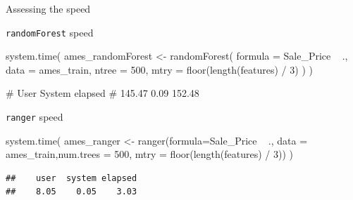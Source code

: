 \documentclass[
  10pt,
  ignorenonframetext,
]{beamer}
\newenvironment{Shaded}{}{}
\newcommand{\CommentTok}[1]{\textcolor[rgb]{0.00,0.50,0.00}{#1}}
\newcommand{\DataTypeTok}[1]{#1}
\newcommand{\DecValTok}[1]{#1}
\newcommand{\KeywordTok}[1]{\textcolor[rgb]{0.00,0.00,1.00}{#1}}
\newcommand{\NormalTok}[1]{#1}
\newcommand{\OperatorTok}[1]{#1}
\newcommand{\StringTok}[1]{\textcolor[rgb]{0.00,0.50,0.50}{#1}}
\begin{document}
\begin{frame}[fragile]{Assessing the speed}
\protect\hypertarget{assessing-the-speed}{}

\begin{block}{\texttt{randomForest} speed}

\begin{Shaded}
\begin{Highlighting}[]
\KeywordTok{system.time}\NormalTok{(}
\NormalTok{  ames_randomForest <-}\StringTok{ }\KeywordTok{randomForest}\NormalTok{(}
    \DataTypeTok{formula =}\NormalTok{ Sale_Price }\OperatorTok{~}\StringTok{ }\NormalTok{., }
    \DataTypeTok{data    =}\NormalTok{ ames_train, }
    \DataTypeTok{ntree   =} \DecValTok{500}\NormalTok{,}
    \DataTypeTok{mtry    =} \KeywordTok{floor}\NormalTok{(}\KeywordTok{length}\NormalTok{(features) }\OperatorTok{/}\StringTok{ }\DecValTok{3}\NormalTok{)}
\NormalTok{  )}
\NormalTok{)}
\end{Highlighting}
\end{Shaded}

\begin{Shaded}
\begin{Highlighting}[]
\CommentTok{#       User      System    elapsed }
\CommentTok{#     145.47        0.09      152.48 }
\end{Highlighting}
\end{Shaded}

\end{block}

\end{frame}

\begin{frame}[fragile]{\texttt{ranger} speed}
\protect\hypertarget{ranger-speed}{}

\begin{Shaded}
\begin{Highlighting}[]
\KeywordTok{system.time}\NormalTok{(}
\NormalTok{  ames_ranger <-}\StringTok{ }\KeywordTok{ranger}\NormalTok{(}\DataTypeTok{formula=}\NormalTok{Sale_Price }\OperatorTok{~}\StringTok{ }\NormalTok{., }
    \DataTypeTok{data      =}\NormalTok{ ames_train,}\DataTypeTok{num.trees =} \DecValTok{500}\NormalTok{,}
    \DataTypeTok{mtry      =} \KeywordTok{floor}\NormalTok{(}\KeywordTok{length}\NormalTok{(features) }\OperatorTok{/}\StringTok{ }\DecValTok{3}\NormalTok{))}
\NormalTok{)}
\end{Highlighting}
\end{Shaded}

\begin{verbatim}
##    user  system elapsed 
##    8.05    0.05    3.03
\end{verbatim}

\end{frame}
\end{document}
